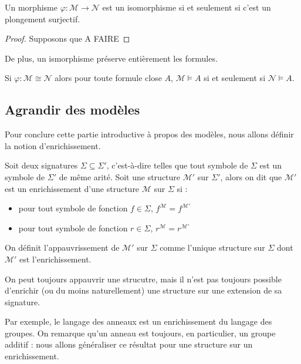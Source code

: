 \begin{proposition}
  Un morphisme $\varphi : \mathcal M \to \mathcal N$ est un isomorphisme si et
  seulement si c'est un plongement surjectif.
\end{proposition}

\begin{proof}
  Supposons que A FAIRE
\end{proof}

De plus, un ismorphisme préserve entièrement les formules.

\begin{proposition}
  Si $\varphi : \mathcal M \cong \mathcal N$ alors pour toute formule close $A$,
  $\mathcal M\models A$ si et seulement si $\mathcal N\models A$.
\end{proposition}

\subsection{Agrandir des modèles}

Pour conclure cette partie introductive à propos des modèles, nous allons définir
la notion d'enrichissement.

\begin{definition}[Enrichissement]
  Soit deux signatures $\Sigma\subseteq\Sigma'$, c'est-à-dire telles que tout
  symbole de $\Sigma$ est un symbole de $\Sigma'$ de même arité. Soit une
  structure $\mathcal M'$ sur $\Sigma'$, alors on dit que $\mathcal M'$ est un
  enrichissement d'une structure $\mathcal M$ sur $\Sigma$ si :
  \begin{itemize}
  \item pour tout symbole de fonction $f\in \Sigma$,
    $f^{\mathcal M} = f^{\mathcal M'}$
  \item pour tout symbole de fonction $r\in \Sigma$,
    $r^{\mathcal M} = r^{\mathcal M'}$
  \end{itemize}

  On définit l'appauvrissement de $\mathcal M'$ sur $\Sigma$ comme l'unique
  structure sur $\Sigma$ dont $\mathcal M'$ est l'enrichissement.
\end{definition}

\begin{remark}
  On peut toujours appauvrir une strucutre, mais il n'est pas toujours possible
  d'enrichir (ou du moins naturellement) une structure sur une extension de sa
  signature.
\end{remark}

Par exemple, le langage des anneaux est un enrichissement du langage des groupes.
On remarque qu'un anneau est toujours, en particulier, un groupe additif : nous
allons généraliser ce résultat pour une structure sur un enrichissement.

